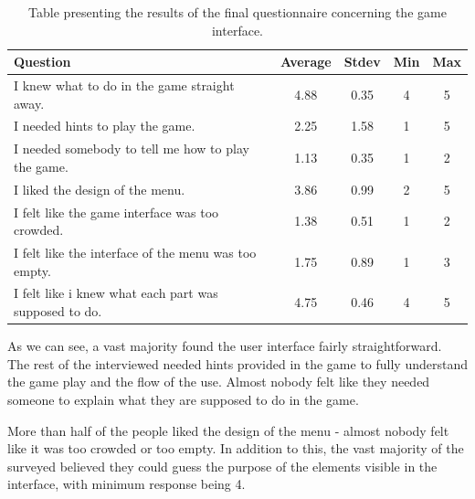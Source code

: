\begin{table}
\begin{center}
\begin{tabular}{| p{8cm} | c | c | c | c | } 																	  \hline 
 \textbf{Question} & \textbf{Average} & \textbf{Stdev} & \textbf{Min} & \textbf{Max } \\ \hline \hline
 I knew what to do in the game straight away. 				& 4.88 & 0.35 & 4 & 5		   \\ \hline 
 I needed hints to play the game. 								& 2.25 & 1.58 & 1 & 5 	   \\ \hline 
 I needed somebody to tell me how to play the game. 	& 1.13 & 0.35 & 1 & 2  	   \\ \hline 
 I liked the design of the menu. 									& 3.86 & 0.99 & 2 & 5   	   \\ \hline 
 I felt like the game interface was too crowded. 				& 1.38 & 0.51 & 1 & 2 	   \\ \hline 
 I felt like the interface of the menu was too empty.		& 1.75 & 0.89 & 1 & 3		   \\ \hline
 I felt like i knew what each part was supposed to do. 	& 4.75 & 0.46 & 4 & 5		   \\ \hline
\end{tabular}
\caption{Table presenting the results of the final questionnaire concerning the game interface.}
\label{table:finalquestionsinterface}
\end{center}
\end{table}

As we can see, a vast majority found the user interface fairly straightforward. The rest of the interviewed needed hints provided in the game to fully understand the game play and the flow of the use. Almost nobody felt like they needed someone to explain what they are supposed to do in the game. 

More than half of the people liked the design of the menu - almost nobody felt like it was too crowded or too empty. In addition to this, the vast majority of the surveyed believed they could guess the purpose of the elements visible in the interface, with minimum response being 4.

